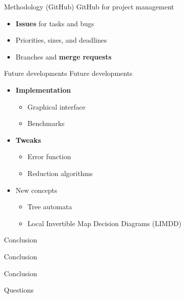 \documentclass[french, 12pt]{beamer}
\begin{document}
\begin{frame}{Methodology (GitHub)}
    GitHub for project management
    \begin{itemize}
        \item \textbf{Issues} for tasks and bugs
        \item Priorities, sizes, and deadlines
        \item Branches and \textbf{merge requests}
    \end{itemize}
\end{frame}



\begin{frame}{Future developments}
Future developments
\begin{itemize}
    \item \textbf{Implementation}
    \begin{itemize}
        \item Graphical interface
        \item Benchmarks
    \end{itemize}
    \item \textbf{Tweaks}
    \begin{itemize}
        \item Error function
        \item Reduction algorithms
    \end{itemize}
    \item New concepts
    \begin{itemize}
        \item Tree automata
        \item Local Invertible Map Decision Diagrams (LIMDD)
    \end{itemize}
\end{itemize}
\end{frame}



\begin{frame}{Conclusion}
\begin{center}
    \huge{Conclusion}
\end{center}
\end{frame}

\begin{frame}{Conclusion}
    \begin{center}
        \huge{Questions}
    \end{center}
\end{frame}


\end{document}
